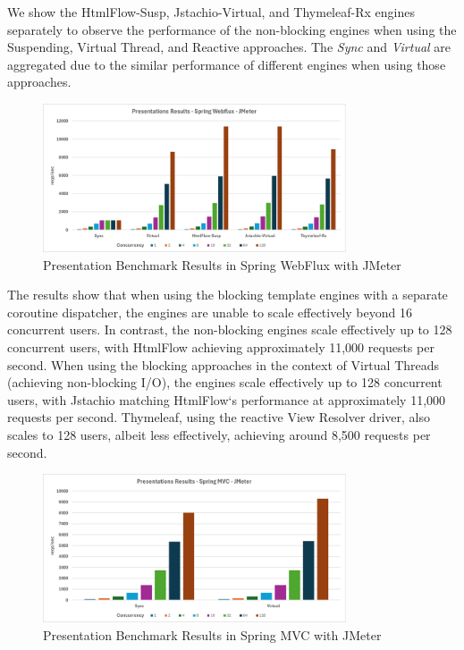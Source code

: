 We show the HtmlFlow-Susp, Jstachio-Virtual, and Thymeleaf-Rx engines
separately to observe the performance of the non-blocking engines when using
the Suspending, Virtual Thread, and Reactive approaches. The \textit{Sync} and
\textit{Virtual} are aggregated due to the similar performance of different
engines when using those approaches.

\begin{figure}[h]
     \centering
     \includegraphics[width=0.8\textwidth]{./Graphs/presentations-webflux-jmeter.png}
     \caption{Presentation Benchmark Results in Spring WebFlux with JMeter}\label{fig:presentations-webflux-jmeter}
\end{figure}

The results show that when using the blocking template engines with a separate
coroutine dispatcher, the engines are unable to scale effectively beyond 16
concurrent users. In contrast, the non-blocking engines scale effectively up to
128 concurrent users, with HtmlFlow achieving approximately 11,000 requests per
second. When using the blocking approaches in the context of Virtual Threads
(achieving non-blocking I/O), the engines scale effectively up to 128
concurrent users, with Jstachio matching HtmlFlow`s performance at
approximately 11,000 requests per second. Thymeleaf, using the reactive View
Resolver driver, also scales to 128 users, albeit less effectively, achieving
around 8,500 requests per second.

\begin{figure}[h]
     \centering
     \includegraphics[width=0.8\textwidth]{./Graphs/presentations-springmvc-jmeter.png}
     \caption{Presentation Benchmark Results in Spring MVC with JMeter}\label{fig:presentations-springmvc-jmeter}
\end{figure}

